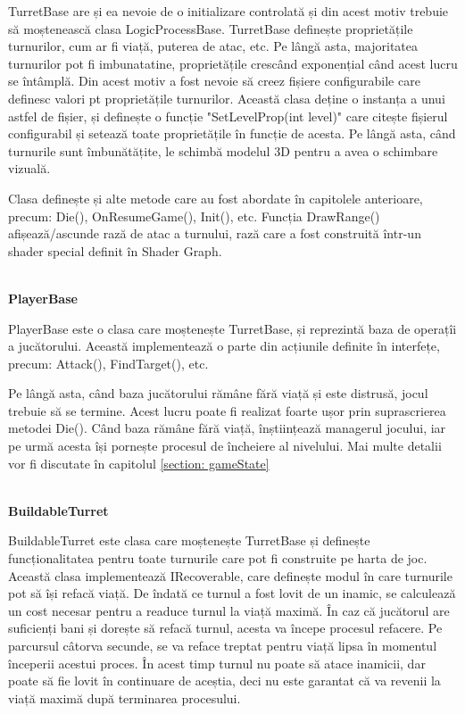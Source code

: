 \documentclass[12pt, a4paper]{article}
\begin{document}
	TurretBase are și ea nevoie de o initializare controlată și din acest motiv trebuie să moștenească clasa LogicProcessBase. TurretBase definește proprietățile turnurilor, cum ar fi viață, puterea de atac, etc. Pe lângă asta, majoritatea turnurilor pot fi imbunatatine, proprietățile crescând exponențial când acest lucru se întâmplă. Din acest motiv a fost nevoie să creez fișiere configurabile care definesc valori pt proprietățile turnurilor. Această clasa deține o instanța a unui astfel de fișier, și definește o funcție "SetLevelProp(int level)" care citește fișierul configurabil și setează toate proprietățile în funcție de acesta. Pe lângă asta, când turnurile sunt îmbunătățite, le schimbă modelul 3D pentru a avea o schimbare vizuală.
	\newline
	
	Clasa definește și alte metode care au fost abordate în capitolele anterioare, precum: Die(), OnResumeGame(), Init(), etc. Funcția DrawRange() afișează/ascunde rază de atac a turnului, rază care a fost construită într-un shader special definit în Shader Graph.
	
	\ \\
	\textbf{PlayerBase}
	
	PlayerBase este o clasa care moștenește TurretBase, și reprezintă baza de operațîi a jucătorului. Această implementează o parte din acțiunile definite în interfețe, precum: Attack(), FindTarget(), etc.
	\newline
	
	Pe lângă asta, când baza jucătorului rămâne fără viață și este distrusă, jocul trebuie să se termine. Acest lucru poate fi realizat foarte ușor prin suprascrierea metodei Die(). Când baza rămâne fără viață, înștiințează managerul jocului, iar pe urmă acesta își pornește procesul de încheiere al nivelului. Mai multe detalii vor fi discutate în capitolul \ref{section: gameState}
	
	\ \\
	\textbf{BuildableTurret}
	
	BuildableTurret este clasa care moștenește TurretBase și definește funcționalitatea pentru toate turnurile care pot fi construite pe harta de joc. Această clasa implementează IRecoverable, care definește modul în care turnurile pot să își refacă viață. De îndată ce turnul a fost lovit de un inamic, se calculează un cost necesar pentru a readuce turnul la viață maximă. În caz că jucătorul are suficienți bani și dorește să refacă turnul, acesta va începe procesul refacere. Pe parcursul câtorva secunde, se va reface treptat pentru viață lipsa în momentul începerii acestui proces. În acest timp turnul nu poate să atace inamicii, dar poate să fie lovit în continuare de aceștia, deci nu este garantat că va revenii la viață maximă după terminarea procesului.
	\newline
	
\end{document}
